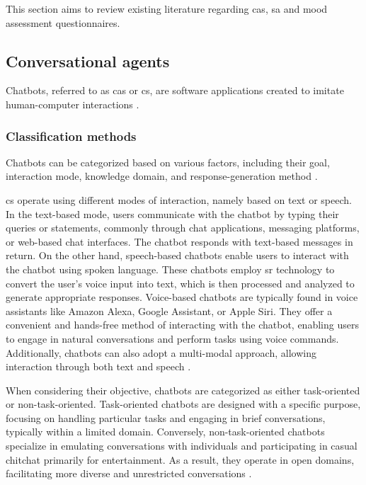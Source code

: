 \documentclass[a4paper,fleqn]{cas-sc}
\begin{document}
This section aims to review existing literature regarding \gls{cas}, \gls{sa} and mood assessment questionnaires.

\subsection{Conversational agents}
\label{conversationalAgents}

Chatbots, referred to as \gls{cas} or \gls{cs}, are software applications created to imitate human-computer interactions  \cite{montenegro_survey_2019}.

\subsubsection{Classification methods}

Chatbots can be categorized based on various factors, including their goal, interaction mode, knowledge domain, and response-generation method \cite{hussain_survey_2019}.

\gls{cs} operate using different modes of interaction, namely based on text or speech. In the text-based mode, users communicate with the chatbot by typing their queries or statements, commonly through chat applications, messaging platforms, or web-based chat interfaces. The chatbot responds with text-based messages in return. On the other hand, speech-based chatbots enable users to interact with the chatbot using spoken language. These chatbots employ \gls{sr} technology to convert the user's voice input into text, which is then processed and analyzed to generate appropriate responses. Voice-based chatbots are typically found in voice assistants like Amazon Alexa, Google Assistant, or Apple Siri. They offer a convenient and hands-free method of interacting with the chatbot, enabling users to engage in natural conversations and perform tasks using voice commands. Additionally, chatbots can also adopt a multi-modal approach, allowing interaction through both text and speech \cite{montenegro_survey_2019}.

When considering their objective, chatbots are categorized as either task-oriented or non-task-oriented. Task-oriented chatbots are designed with a specific purpose, focusing on handling particular tasks and engaging in brief conversations, typically within a limited domain. Conversely, non-task-oriented chatbots specialize in emulating conversations with individuals and participating in casual chitchat primarily for entertainment. As a result, they operate in open domains, facilitating more diverse and unrestricted conversations \cite{hussain_survey_2019}.
\end{document}
